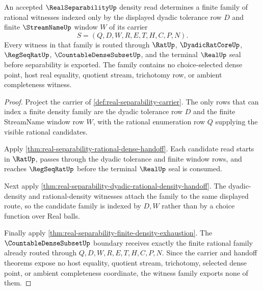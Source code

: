 \begin{theorem}
\label{thm:real-separability-dyadic-witness-family}
An accepted $\RealSeparabilityUp$ density read determines a finite family of rational witnesses indexed only by the displayed dyadic tolerance row $D$ and finite $\StreamNameUp$ window $W$ of its carrier
$$
S=(Q,D,W,R,E,T,H,C,P,N).
$$
Every witness in that family is routed through $\RatUp$, $\DyadicRatCoreUp$, $\RegSeqRatUp$, $\CountableDenseSubsetUp$, and the terminal $\RealUp$ seal before separability is exported. The family contains no choice-selected dense point, host real equality, quotient stream, trichotomy row, or ambient completeness witness.
\end{theorem}
\begin{proof}
Project the carrier of \autoref{def:real-separability-carrier}. The only rows that can index a finite density family are the dyadic tolerance row $D$ and the finite StreamName window row $W$, with the rational enumeration row $Q$ supplying the visible rational candidates.

Apply \autoref{thm:real-separability-rational-dense-handoff}. Each candidate read starts in $\RatUp$, passes through the dyadic tolerance and finite window rows, and reaches $\RegSeqRatUp$ before the terminal $\RealUp$ seal is consumed.

Next apply \autoref{thm:real-separability-dyadic-rational-density-handoff}. The dyadic-density and rational-density witnesses attach the family to the same displayed route, so the candidate family is indexed by $D,W$ rather than by a choice function over Real balls.

Finally apply \autoref{thm:real-separability-finite-density-exhaustion}. The $\CountableDenseSubsetUp$ boundary receives exactly the finite rational family already routed through $Q,D,W,R,E,T,H,C,P,N$. Since the carrier and handoff theorems expose no host equality, quotient stream, trichotomy, selected dense point, or ambient completeness coordinate, the witness family exports none of them.
\end{proof}

